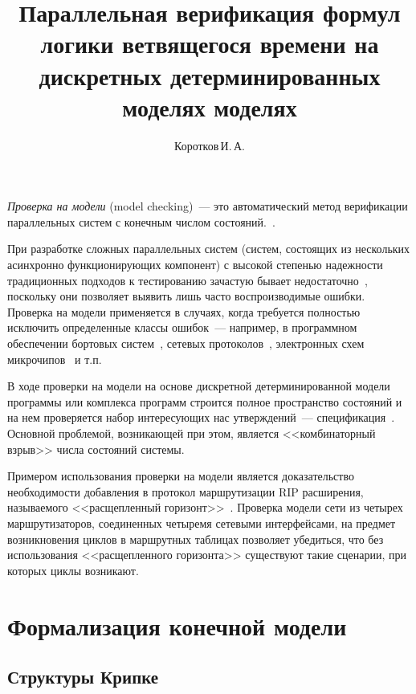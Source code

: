 \documentclass[a4paper,notitlepage,14pt]{article}
\title{Параллельная верификация формул логики ветвящегося времени на дискретных
  детерминированных моделях моделях} \author{Коротков\,И.\,А.}
\begin{document}
\maketitle

\emph{Проверка на модели} (model checking)~--- это автоматический метод верификации
параллельных систем с конечным числом состояний.~\cite{Clarke}.

При разработке сложных параллельных систем (систем, состоящих из нескольких асинхронно
функционирующих компонент) с высокой степенью надежности традиционных подходов к
тестированию зачастую бывает недостаточно~\cite{Clarke}, поскольку они позволяет выявить
лишь часто воспроизводимые ошибки. Проверка на модели применяется в случаях, когда
требуется полностью исключить определенные классы ошибок~--- например, в программном
обеспечении бортовых систем~\cite{Havelund98formalanalysis,CamaraArincModel}, сетевых
протоколов~\cite{RipOnSpin}, электронных схем микрочипов~\cite{Glazberg_psl:beyond} и т.п.

В ходе проверки на модели на основе дискретной детерминированной модели программы или
комплекса программ строится полное пространство состояний и на нем проверяется набор
интересующих нас утверждений~--- спецификация~\cite{Velder}. Основной проблемой,
возникающей при этом, является <<комбинаторный взрыв>> числа состояний
системы\cite{Clarke}.

Примером использования проверки на модели является доказательство необходимости добавления
в протокол маршрутизации RIP расширения, называемого <<расщепленный
горизонт>>~\cite{Black00:IP}. Проверка модели сети из четырех маршрутизаторов, соединенных
четыремя сетевыми интерфейсами, на предмет возникновения циклов в маршрутных таблицах
позволяет убедиться, что без использования <<расщепленного горизонта>> существуют такие
сценарии, при которых циклы возникают.~\cite{RipOnSpin}


\section{Формализация конечной модели}
\label{sec:modelchecking}

\subsection{Структуры Крипке}
\label{sec:kripke}
\end{document}
